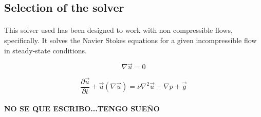 \subsection{Selection of the solver}

\paragraph{}This solver used has been designed to work with non compressible flows, specifically. It solves the Navier Stokes equations for a given incompressible flow in steady-state conditions.

\begin{equation}
\nabla \vec{u} = 0
\end{equation}

\begin{equation}
\frac{\partial \vec{u}}{\partial t} + \vec{u} (\nabla \vec{u}) = \nu \nabla^2 \vec{u} - \nabla p + \vec{g}
\end{equation}

\paragraph{}\textbf{NO SE QUE ESCRIBO...TENGO SUEÑO}
